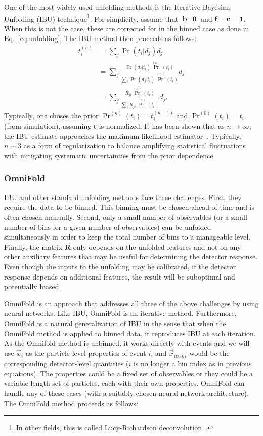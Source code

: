 One of the most widely used unfolding methods is the Iterative Bayesian Unfolding (IBU) technique\footnote{In other fields, this is called Lucy-Richardson deconvolution~\cite{1974AJ.....79..745L,Richardson:72}.}.   For simplicity, assume that $\textbf{b}=\textbf{0}$ and $\textbf{f}=\textbf{c}=\textbf{1}$.  When this is not the case, these are corrected for in the binned case as done in Eq.~\ref{eq:unfolding}.   The IBU method then proceeds as follows:
\begin{align}
t_i^{(n)}&=\sum_j \Pr(t_i|d_j) d_j \\
&=\sum_j \frac{\Pr(d_j|t_i)\Pr^{(n)}(t_i)}{\sum_i \Pr(d_j|t_i)\Pr^{(n)}(t_i)} d_j \\
&=\sum_j \frac{R_{ji}\Pr^{(n)}(t_i)}{\sum_i R_{ji}\Pr^{(n)}(t_i)} d_j.
\end{align}
%
Typically, one choses the prior $\Pr^{(n)}(t_i)=t_i^{(n-1)}$ and $\Pr^{(0)}(t_i)=t_i$ (from simulation), assuming $\textbf{t}$ is normalized.  It has been shown that as $n\rightarrow\infty$, the IBU estimate approaches the maximum likelihood estimator~\cite{shepp1982maximum}.  Typically, $n\sim 3$ as a form of regularization to balance amplifying statistical fluctuations with mitigating systematic uncertainties from the prior dependence.

\subsubsection{OmniFold}
\label{subsec:omnifold}

IBU and other standard unfolding methods face three challenges.  First, they require the data to be binned.  This binning must be chosen ahead of time and is often chosen manually.  Second, only a small number of observables (or a small number of bins for a given number of observables) can be unfolded simultaneously in order to keep the total number of bins to a manageable level.  Finally, the matrix $\textbf{R}$ only depends on the unfolded features and not on any other auxiliary features that may be useful for determining the detector response.  Even though the inputs to the unfolding may be calibrated, if the detector response depends on additional features, the result will be suboptimal and potentially biased.

OmniFold is an approach that addresses all three of the above challenges by using neural networks.  Like IBU, OmniFold is an iterative method.  Furthermore, OmniFold is a natural generalization of IBU in the sense that when the OmniFold method is applied to binned data, it reproduces IBU at each iteration.  
As the Omnifold method is unbinned, it works directly with events and we will use $\vec{x}_i$ as the particle-level properties of event $i$, and $\vec{x}_{\mathrm{reco},i}$ would be the corresponding detector-level quantities ($i$ is no longer a bin index as in previous equations).  The properties could be a fixed set of observables or they could be a variable-length set of particles, each with their own properties.  OmniFold can handle any of these cases (with a suitably chosen neural network architecture). 
The OmniFold method proceeds as follows:

